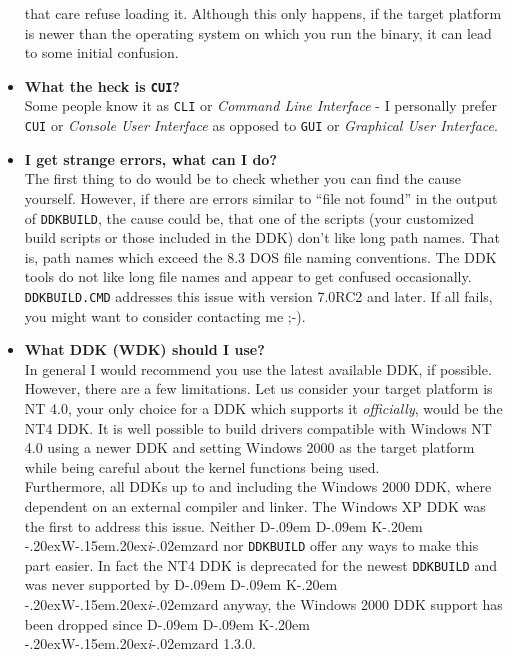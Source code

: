 \documentclass[a4paper,titlepage]{report}
\def\ddkwiz{D\kern-.09em D\kern-.09em K\kern-.20em \raise-.20ex\hbox{W}\kern-.15em\raise.20ex\hbox{\it{i}}\kern-.02em{zard}}
\begin{document}
\begin{itemize}
        that care refuse loading it. Although this only happens, if the target platform
        is newer than the operating system on which you run the binary, it can lead
        to some initial confusion.
  \item \textbf{What the heck is \texttt{CUI}?}\\
        Some people know it as \texttt{CLI} or \emph{Command Line Interface} - I
        personally prefer \texttt{CUI} or \emph{Console User Interface} as opposed
        to \texttt{GUI} or \emph{Graphical User Interface}.
  \item \textbf{I get strange errors, what can I do?}\\
        The first thing to do would be to check whether you can find the cause yourself.
        However, if there are errors similar to ``file not found'' in the output of
        \texttt{DDKBUILD}, the cause could be, that one of the scripts (your customized
        build scripts or those included in the DDK) don't like long path names. That is,
        path names which exceed the 8.3 DOS file naming conventions. The DDK tools do not
        like long file names and appear to get confused occasionally. \texttt{DDKBUILD.CMD}
        addresses this issue with version 7.0RC2 and later. If all fails, you might want to
        consider contacting me \textsf{;-)}.
  \item {}
        \textbf{What DDK (WDK) should I use?}\\
        In general I would recommend you use the latest available DDK, if possible. However,
        there are a few limitations. Let us consider your target platform is NT 4.0, your
        only choice for a DDK which supports it \emph{officially}, would be the NT4 DDK.
        It is well possible to build drivers compatible with Windows NT 4.0 using a newer
        DDK and setting Windows 2000 as the target platform while being careful about
        the kernel functions being used.\\
        Furthermore, all DDKs up to and including the Windows 2000 DDK, where dependent
        on an external compiler and linker. The Windows XP DDK was the first to address
        this issue. Neither \ddkwiz{} nor \texttt{DDKBUILD} offer any ways to make this
        part easier.
        In fact the NT4 DDK is deprecated for the newest \texttt{DDKBUILD} and was never
        supported by \ddkwiz{} anyway, the Windows 2000 DDK support has been dropped
        since \ddkwiz{} 1.3.0.\\

\end{itemize}
\end{document}
